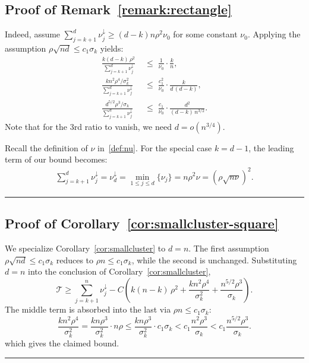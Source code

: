 \documentclass{article}
\newcommand{\Tcal}{\mathcal{T}}
\newcommand{\BlackBox}{\rule{1.5ex}{1.5ex}}  %
\newenvironment{proof}{\par\noindent{\bf Proof\ }}{\hfill\BlackBox\par\medskip}
\newcommand{\rbr}[1]{\left(#1\right)}
\begin{document}
\subsection{Proof of Remark~\ref{remark:rectangle}}\label{app:remark_rectangle}
\begin{proof}
    Indeed, assume $\sum_{j=k+1}^{d}\nu_j^\downarrow \ge (d-k) n \rho^2 \nu_0$ for some constant $\nu_0$. Applying the assumption $\rho \sqrt{n d}\le c_1 \sigma_k$ yields:
\begin{align*}
    \frac{k(d-k)\,\rho^2}{\sum_{j=k+1}^{d}\nu_j^\downarrow}\;&\le\; \frac{1}{\nu_0}\cdot\frac{k}{n}, \\
    \frac{kn^2\rho^4/\sigma_k^2}{\sum_{j=k+1}^{d}\nu_j^\downarrow}\;&\le\; \frac{c_1^2}{\nu_0}\cdot\frac{k}{d\,(d-k)}, \\
    \frac{d^{5/2}\rho^3/\sigma_k}{\sum_{j=k+1}^{d}\nu_j^\downarrow}\;&\le\; \frac{c_1}{\nu_0}\cdot\frac{d^{2}}{(d-k)\,n^{3/2}}.
\end{align*}
Note that for the 3rd ratio to vanish, we need $d = o (n^{3/4})$.

Recall the definition of $\nu$ in~\eqref{def:nu}. For the special case $k = d-1$, the leading term of our bound becomes:
\begin{align*}
    \sum_{j=k+1}^{d}\nu_j^\downarrow = \nu_d^\downarrow = \min_{1\le j\le d}\{\nu_j\} = n \rho^2 \nu = \rbr{ \rho \sqrt{n \nu}}^2.
\end{align*}
\end{proof}

\subsection{Proof of Corollary~\ref{cor:smallcluster-square}}\label{app:smallcluster-square}

\begin{proof}
We specialize Corollary~\ref{cor:smallcluster} to $d=n$. The first assumption $\rho\sqrt{nd}\le c_1\sigma_k$ reduces to $\rho n\le c_1\sigma_k$, while the second is unchanged. Substituting $d=n$ into the conclusion of Corollary~\ref{cor:smallcluster},
\begin{equation*}
    \Tcal\ge \sum_{j=k+1}^{n}\nu_j^\downarrow - C\rbr{k(n-k)\,\rho^2 + \frac{kn^2\rho^4}{\sigma_k^2}+\frac{n^{5/2}\rho^3}{\sigma_k}}.
\end{equation*}
The middle term is absorbed into the last via $\rho n\le c_1\sigma_k$:
\begin{equation*}
    \frac{k n^2 \rho^4}{\sigma_k^2} = \frac{k n \rho^3}{\sigma_k^2} \cdot n \rho \le \frac{k n \rho^3}{\sigma_k^2} \cdot c_1 \sigma_k < c_1 \frac{n^2 \rho^3}{\sigma_k} < c_1 \frac{n^{5/2}\rho^3}{\sigma_k}.
\end{equation*}
which gives the claimed bound.
\end{proof}
\end{document}

